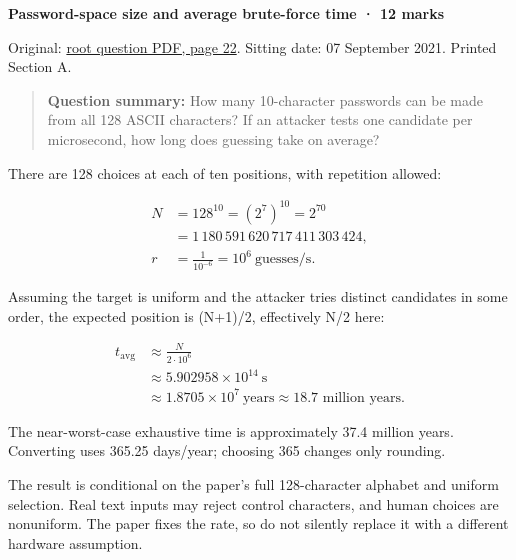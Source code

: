 \documentclass[11pt,a4paper]{article}
\begin{document}
\textbf{Password-space size and average brute-force time · 12 marks}


Original: \href{../../CSE405-Security_Merged.pdf\#page=22}{root question PDF,\allowbreak{} page 22}. Sitting date: 07 September 2021. Printed Section A.



\begin{quote}\small

\textbf{Question summary:} How many 10-character passwords can be made from all 128 ASCII characters? If an attacker tests one candidate per microsecond,\allowbreak{} how long does guessing take on average?



\end{quote}

There are 128 choices at each of ten positions,\allowbreak{} with repetition allowed:



\[
\begin{aligned}N&=128^{10}=(2^7)^{10}=2^{70}\\&=1\,180\,591\,620\,717\,411\,303\,424,\\r&=\frac1{10^{-6}}=10^6\ \mathrm{guesses/s}.\end{aligned}
\]

Assuming the target is uniform and the attacker tries distinct candidates in some order,\allowbreak{} the expected position is (N+1)/\allowbreak{}2,\allowbreak{} effectively N/\allowbreak{}2 here:



\[
\begin{aligned}t_{\mathrm{avg}}&\approx\frac{N}{2\cdot10^6}\\&\approx5.902958\times10^{14}\ \mathrm{s}\\&\approx1.8705\times10^7\ \mathrm{years}\approx18.7\text{ million years}.\end{aligned}
\]

The near-worst-case exhaustive time is approximately 37.4 million years. Converting uses 365.25 days/\allowbreak{}year; choosing 365 changes only rounding.


The result is conditional on the paper’s full 128-character alphabet and uniform selection. Real text inputs may reject control characters,\allowbreak{} and human choices are nonuniform. The paper fixes the rate,\allowbreak{} so do not silently replace it with a different hardware assumption.
\end{document}
